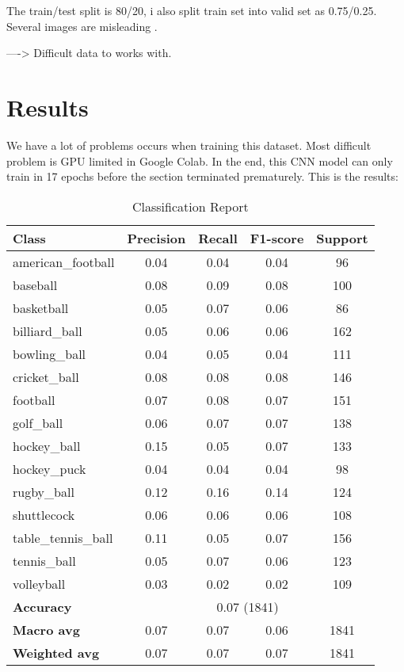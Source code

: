 \documentclass{article}
\begin{document}
The train/test split is 80/20, i also split train set into valid set as 0.75/0.25. Several images are misleading .

----> Difficult data to works with.

\section{Results}

We have a lot of problems occurs when training this dataset. Most difficult problem is GPU limited in Google Colab. 
In the end, this CNN model can only train in 17 epochs before the section terminated prematurely. This is the results:

\begin{table}[h!]
    \centering
    \begin{tabular}{lcccc}
    \toprule
    \textbf{Class} & \textbf{Precision} & \textbf{Recall} & \textbf{F1-score} & \textbf{Support} \\
    \midrule
    american\_football & 0.04 & 0.04 & 0.04 & 96 \\
    baseball & 0.08 & 0.09 & 0.08 & 100 \\
    basketball & 0.05 & 0.07 & 0.06 & 86 \\
    billiard\_ball & 0.05 & 0.06 & 0.06 & 162 \\
    bowling\_ball & 0.04 & 0.05 & 0.04 & 111 \\
    cricket\_ball & 0.08 & 0.08 & 0.08 & 146 \\
    football & 0.07 & 0.08 & 0.07 & 151 \\
    golf\_ball & 0.06 & 0.07 & 0.07 & 138 \\
    hockey\_ball & 0.15 & 0.05 & 0.07 & 133 \\
    hockey\_puck & 0.04 & 0.04 & 0.04 & 98 \\
    rugby\_ball & 0.12 & 0.16 & 0.14 & 124 \\
    shuttlecock & 0.06 & 0.06 & 0.06 & 108 \\
    table\_tennis\_ball & 0.11 & 0.05 & 0.07 & 156 \\
    tennis\_ball & 0.05 & 0.07 & 0.06 & 123 \\
    volleyball & 0.03 & 0.02 & 0.02 & 109 \\
    \midrule
    \textbf{Accuracy} & \multicolumn{4}{c}{0.07 (1841)} \\
    \textbf{Macro avg} & 0.07 & 0.07 & 0.06 & 1841 \\
    \textbf{Weighted avg} & 0.07 & 0.07 & 0.07 & 1841 \\
    \bottomrule
    \end{tabular}
    \caption{Classification Report}
    \end{table}
\end{document}
